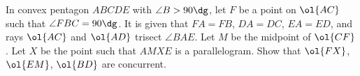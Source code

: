 In convex pentagon $ABCDE$ with $\angle B > 90\dg$,
let $F$ be a point on $\ol{AC}$ such that $\angle FBC = 90\dg$.
It is given that $FA=FB$, $DA=DC$, $EA=ED$,
and rays $\ol{AC}$ and $\ol{AD}$ trisect $\angle BAE$.
Let $M$ be the midpoint of $\ol{CF}$.
Let $X$ be the point such that $AMXE$ is a parallelogram.
Show that $\ol{FX}$, $\ol{EM}$, $\ol{BD}$ are concurrent.